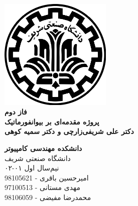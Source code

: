 \documentclass{article}
\begin{document}
\begin{titlepage}
	\begin{center}
		\vspace{0.2cm}
		
		\includegraphics[width=0.4\textwidth]{sharif.png}\\
		\vspace{0.5cm}
		\textbf{ \Huge{فاز دوم}}\\
		\vspace{0.25cm}
		\textbf{ \Large{پروژه مقدمه‌ای بر بیوانفورماتیک \\ دکتر علی  شریفی‌زارچی و دکتر سمیه کوهی}}
		\vspace{0.2cm}
		
		
		\large \textbf{دانشکده مهندسی کامپیوتر}\\\vspace{0.1cm}
		\large   دانشگاه صنعتی شریف\\\vspace{0.2cm}
		\large   ﻧﯿﻢ‌سال اول ۰۱-۰۲ \\\vspace{0.2cm}
		\large{\Large{امیرحسین باقری - 98105621}}\\
		\large{\Large{مهدی مستانی - 97100513}}\\
		\large{\Large{محمدرضا مفیضی - 98106059}}\\
	\end{center}
\end{titlepage}

\newpage
\tableofcontents
\newpage
\pagestyle{fancy}
\fancyhf{}
\fancyfoot{}
\setlength{\headheight}{59pt}
\cfoot{\thepage}
\end{document}
